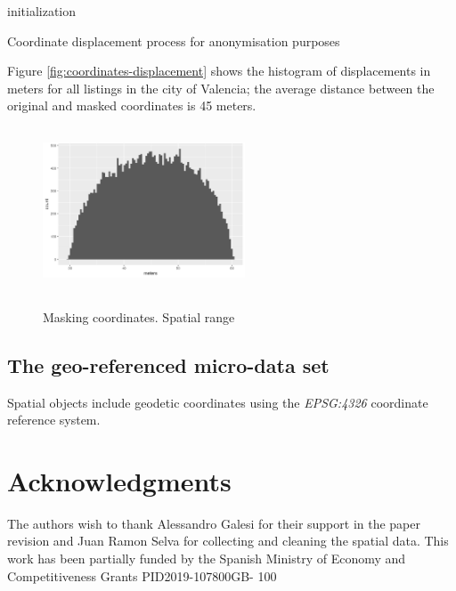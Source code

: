 \documentclass[Royal,times,sageh]{sagej}
\begin{document}
\begin{algorithm}[!ht]
 initialization\;
 \caption{Coordinate displacement process for anonymisation purposes}
 \label{algo:coordinates-displacement}
\end{algorithm}

Figure \ref{fig:coordinates-displacement} shows the histogram of
displacements in meters for all listings in the city of Valencia; the
average distance between the original and masked coordinates is 45
meters.

\begin{figure}[!ht]
  \caption{Masking coordinates. Spatial range}
  \centering
  \includegraphics[width=6cm, height=4.9cm]{EPB_files/coordinates-valencia.png}
  \label{fig:points-moved-image}
\end{figure}

\hypertarget{the-geo-referenced-micro-data-set}{%
\subsection{The geo-referenced micro-data
set}\label{the-geo-referenced-micro-data-set}}

Spatial objects include geodetic coordinates using the \emph{EPSG:4326}
coordinate reference system.

\hypertarget{acknowledgments}{%
\section{Acknowledgments}\label{acknowledgments}}

The authors wish to thank Alessandro Galesi for their support in the
paper revision and Juan Ramon Selva for collecting and cleaning the
spatial data. This work has been partially funded by the Spanish
Ministry of Economy and Competitiveness Grants PID2019-107800GB- 100



\end{document}

